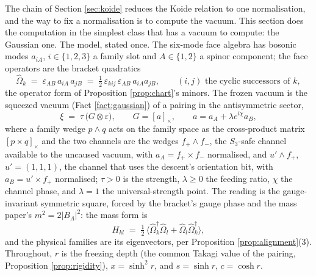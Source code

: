 \documentclass[11pt]{article}
\theoremstyle{definition}
\begin{document}
The chain of Section \ref{sec:koide} reduces the Koide relation to one normalisation, and the way to fix a normalisation is to compute the vacuum. This section does the computation in the simplest class that has a vacuum to compute: the Gaussian one. The model, stated once. The six-mode face algebra has bosonic modes $a_{iA}$, $i \in \{1,2,3\}$ a family slot and $A \in \{1,2\}$ a spinor component; the face operators are the bracket quadratics
\[
\hat\Omega_{k} \;=\; \varepsilon_{AB}\,a_{iA}\,a_{jB} \;=\; \tfrac12\,\varepsilon_{kij}\,\varepsilon_{AB}\,a_{iA}a_{jB}, \qquad (i,j) \text{ the cyclic successors of } k,
\]
the operator form of Proposition \ref{prop:chart}'s minors. The frozen vacuum is the squeezed vacuum (Fact \ref{fact:gaussian}) of a pairing in the antisymmetric sector,
\[
\xi \;=\; \tau\,\bigl(G \otimes \varepsilon\bigr), \qquad G = [a]_{\times}, \qquad a = a_{A} + \lambda e^{i\chi}a_{B},
\]
where a family wedge $p \wedge q$ acts on the family space as the cross-product matrix $[p \times q]_{\times}$ and the two channels are the wedges $f_{+} \wedge f_{-}$, the $S_{3}$-safe channel available to the uncaused vacuum, with $a_{A} = f_{+} \times f_{-}$ normalised, and $u' \wedge f_{+}$, $u' = (1,1,1)$, the channel that uses the descent's orientation bit, with $a_{B} = u' \times f_{+}$ normalised; $\tau > 0$ is the strength, $\lambda \ge 0$ the feeding ratio, $\chi$ the channel phase, and $\lambda = 1$ the universal-strength point. The reading is the gauge-invariant symmetric square, forced by the bracket's gauge phase and the mass paper's $m^{2} = 2|B_{\Lambda}|^{2}$: the mass form is
\[
H_{kl} \;=\; \tfrac12\,\bigl\langle \hat\Omega_{k}^{\dagger}\hat\Omega_{l} + \hat\Omega_{l}\hat\Omega_{k}^{\dagger}\bigr\rangle,
\]
and the physical families are its eigenvectors, per Proposition \ref{prop:alignment}(3). Throughout, $r$ is the freezing depth (the common Takagi value of the pairing, Proposition \ref{prop:rigidity}), $x = \sinh^{2}r$, and $s = \sinh r$, $c = \cosh r$.
\end{document}
